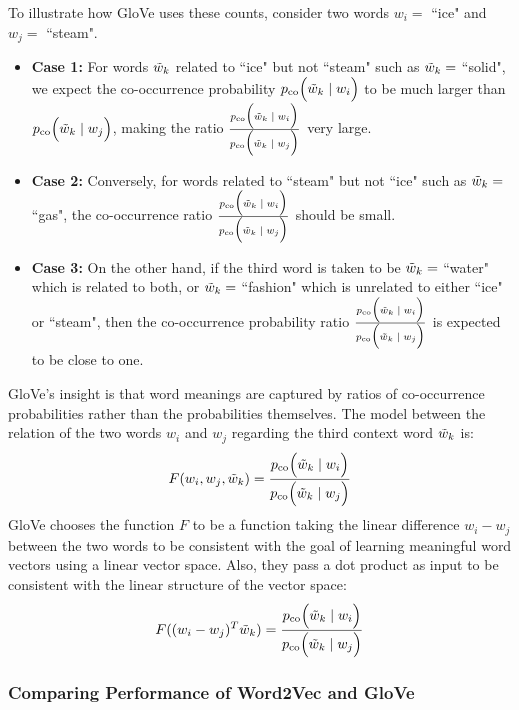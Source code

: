 To illustrate how GloVe uses these counts, consider two words $w_i =$ ``ice" and $w_j = $ ``steam". 

\begin{itemize}
    \item \textbf{Case 1:} For words $\Tilde{w}_k$ related to ``ice" but not ``steam" such as $\Tilde{w}_k = $ ``solid", we expect the co-occurrence probability $p_{\text{co}} \Big( \Tilde{w}_k \; | \; w_i \Big)$ to be much larger than $p_{\text{co}} \Big( \Tilde{w}_k \; | \; w_j \Big)$, making the ratio $\frac {p_{\text{co}} \Big( \Tilde{w}_k \; | \; w_i \Big)} {p_{\text{co}} \Big( \Tilde{w}_k \; | \; w_j \Big)}$ very large.

    \item \textbf{Case 2: } Conversely, for words related to ``steam" but not ``ice" such as $\Tilde{w}_k = $ ``gas", the co-occurrence ratio $\frac {p_{\text{co}} \Big( \Tilde{w}_k \; | \; w_i \Big)} {p_{\text{co}} \Big( \Tilde{w}_k \; | \; w_j \Big)}$ should be small. 

    \item \textbf{Case 3:} On the other hand, if the third word is taken to be $\Tilde{w}_k = $ ``water" which is related to both, or $\Tilde{w}_k = $ ``fashion" which is unrelated to either ``ice" or ``steam", then the co-occurrence probability ratio $\frac {p_{\text{co}} \Big( \Tilde{w}_k \; | \; w_i \Big)} {p_{\text{co}} \Big( \Tilde{w}_k \; | \; w_j \Big)}$ is expected to be close to one. 
\end{itemize}

GloVe's insight is that word meanings are captured by ratios of co-occurrence probabilities rather than the probabilities themselves. The model between the relation of the two words $w_i$ and $w_j$ regarding the third context word $\Tilde{w}_k$ is: 
$$
F(w_i, w_j, \Tilde{w}_k) = \frac {p_{\text{co}} \Big( \Tilde{w}_k \; | \; w_i \Big)} {p_{\text{co}} \Big( \Tilde{w}_k \; | \; w_j \Big)}
$$
GloVe chooses the function $F$ to be a function taking the linear difference $w_i - w_j$ between the two words to be consistent with the goal of learning meaningful word vectors using a linear vector space. Also, they pass a dot product as input to be consistent with the linear structure of the vector space: 
$$
F( (w_i - w_j)^T \Tilde{w}_k) = \frac {p_{\text{co}} \Big( \Tilde{w}_k \; | \; w_i \Big)} {p_{\text{co}} \Big( \Tilde{w}_k \; | \; w_j \Big)}
$$

\subsubsection{Comparing Performance of Word2Vec and GloVe}

